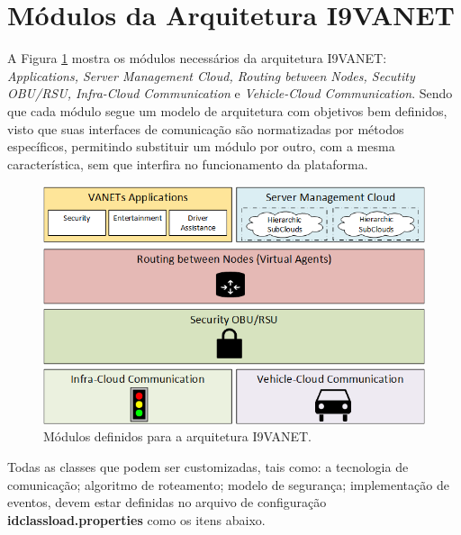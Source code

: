 \documentclass[
	12pt,				%
	oneside,			%
	a4paper,			%
	english,			%
	brazil				%
	]{abntex2ppgsi}
\begin{document}
\section{Módulos da Arquitetura I9VANET}

A Figura \ref{fig:dModulos} mostra os módulos necessários da arquitetura I9VANET:  \textit{Applications, Server Management Cloud, Routing between Nodes, Secutity OBU/RSU, Infra-Cloud Communication} e \textit{Vehicle-Cloud Communication}. Sendo que cada módulo segue um modelo de arquitetura com objetivos bem definidos, visto que suas interfaces de comunicação são normatizadas por métodos específicos, permitindo substituir um módulo por outro, com a mesma característica, sem que interfira no funcionamento da plataforma.

\begin{figure}[h!]
	\centering
	\includegraphics [width=12cm,height=7cm] {images/modulos.png}
	\caption{Módulos definidos para a arquitetura I9VANET.}
	\label{fig:dModulos}
\end{figure}

Todas as classes que podem ser customizadas, tais como: a tecnologia de comunicação; algoritmo de roteamento; modelo de segurança; implementação de eventos, devem estar definidas no arquivo de configuração \textbf{idclassload.properties} como os itens abaixo.
\end{document}
